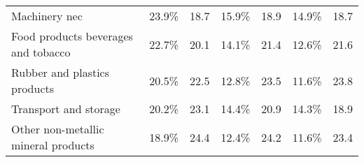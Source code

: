\documentclass[10pt]{article}
\begin{document}
\begin{table}[!h]
{\begin{tabular}{l|cc|cc|cc}
\rowcolor[HTML]{FFFFFF} 
{\color[HTML]{333333} Machinery nec}                                                                      & {\color[HTML]{333333} 23.9\%}                                             & {\color[HTML]{333333} 18.7}                                          & {\color[HTML]{333333} 15.9\%}                                             & {\color[HTML]{333333} 18.9}                                          & {\color[HTML]{333333} 14.9\%}                                             & {\color[HTML]{333333} 18.7}                                          \\
\rowcolor[HTML]{FFFFFF} 
{\color[HTML]{333333} Food products beverages and tobacco}                                                & {\color[HTML]{333333} 22.7\%}                                             & {\color[HTML]{333333} 20.1}                                          & {\color[HTML]{333333} 14.1\%}                                             & {\color[HTML]{333333} 21.4}                                          & {\color[HTML]{333333} 12.6\%}                                             & {\color[HTML]{333333} 21.6}                                          \\
\rowcolor[HTML]{FFFFFF} 
{\color[HTML]{333333} Rubber and plastics products}                                                       & {\color[HTML]{333333} 20.5\%}                                             & {\color[HTML]{333333} 22.5}                                          & {\color[HTML]{333333} 12.8\%}                                             & {\color[HTML]{333333} 23.5}                                          & {\color[HTML]{333333} 11.6\%}                                             & {\color[HTML]{333333} 23.8}                                          \\
\rowcolor[HTML]{FFFFFF} 
{\color[HTML]{333333} Transport and storage}                                                              & {\color[HTML]{333333} 20.2\%}                                             & {\color[HTML]{333333} 23.1}                                          & {\color[HTML]{333333} 14.4\%}                                             & {\color[HTML]{333333} 20.9}                                          & {\color[HTML]{333333} 14.3\%}                                             & {\color[HTML]{333333} 18.9}                                          \\
\rowcolor[HTML]{FFFFFF} 
{\color[HTML]{333333} Other non-metallic mineral products}                                                & {\color[HTML]{333333} 18.9\%}                                             & {\color[HTML]{333333} 24.4}                                          & {\color[HTML]{333333} 12.4\%}                                             & {\color[HTML]{333333} 24.2}                                          & {\color[HTML]{333333} 11.6\%}                                             & {\color[HTML]{333333} 23.4}                                          \\

\end{tabular}}
\end{table}
\end{document}
